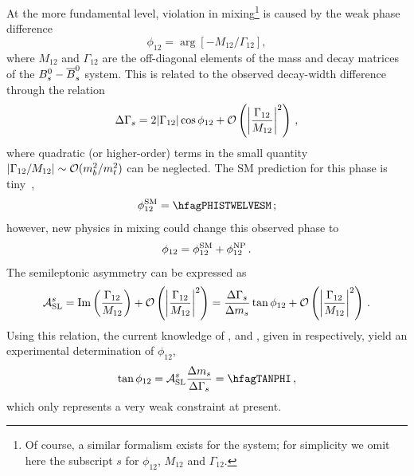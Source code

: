 At the more fundamental level, \CP violation in \Bs
mixing\footnote{
  \label{foot:life_mix:CPVinBd}
  Of course, a similar formalism exists for the \Bd system; for 
  simplicity we omit here the subscript $s$ for $\phi_{12}$, $M_{12}$ and $\Gamma_{12}$.}
is caused by the weak phase difference 
\begin{equation}
\phi_{12} = \arg \left[ -{M_{12}}/{\Gamma_{12}} \right], 
\end{equation}
where $M_{12}$ and $\Gamma_{12}$ are the off-diagonal
elements of the mass and decay matrices of the $\Bs-\Bsbar$ system.
This is related to the observed decay-width difference through the relation
\begin{equation}
\Delta\Gamma_{s} = 2|\Gamma_{12}|\cos\phi_{12}+
{\cal O} \left( \left|\frac{\Gamma_{12}}{M_{12}}\right|^2 \right) \,,
\end{equation}
where quadratic (or higher-order) terms in the small quantity
$|\Gamma_{12}/M_{12}| \sim {\cal O}(m_b^2/m_t^2)$ can be neglected. 
The SM prediction for this phase is tiny~\cite{Lenz:2011ti,*Lenz:2006hd},
\begin{equation}
\phi_{12}^{\rm SM} = \hfagPHISTWELVESM \,;
\labe{phis12SM}
\end{equation}
however, new physics in \Bs mixing could change this observed phase to
\begin{equation}
\phi_{12} = \phi_{12}^{\rm SM} + \phi_{12}^{\rm NP} \,.
\labe{phi12NP}
\end{equation}
The \Bs semileptonic asymmetry can be expressed as~\cite{Beneke:2003az}
\begin{equation}
\ASLs = 
\Im \left(\frac{\Gamma_{12}}{M_{12}} \right) +
{\cal O} \left( \left|\frac{\Gamma_{12}}{M_{12}}\right|^2 \right) =
\frac{\DGs}{\dms}\tan\phi_{12} +
{\cal O} \left( \left|\frac{\Gamma_{12}}{M_{12}}\right|^2 \right) \,.
\labe{ASLS_tanphi12}
\end{equation}
Using this relation, the current knowledge of \ASLs, \DGs and \dms, 
given in  respectively, yield an
experimental determination of $ \phi_{12}$,
\begin{equation}
\tan\phi_{12} = \ASLs \frac{\dms}{\DGs} = \hfagTANPHI \,,
\labe{tanphi12}
\comment{ %
from math import *
asls = -0.010460 ; easls = 0.006400
dms = 17.719032  ; edms = 0.042701
dgs = 0.0951919  ; edgs = 0.01362480381803716 
tanphi12 = asls*dms/dgs
etanphi12 = tanphi12*sqrt((easls/asls)**2+(edms/dms)**2+(edgs/dgs)**2)
print tanphi12, etanphi12
} %
\end{equation}
which only represents a very weak constraint at present.

